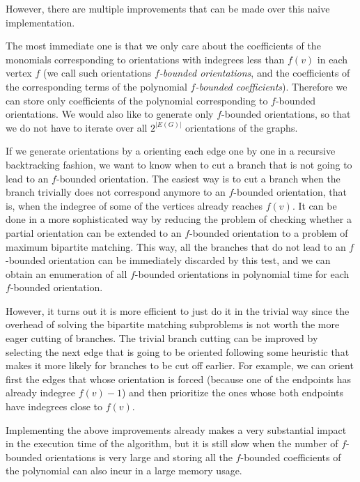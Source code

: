 However, there are multiple improvements that can be made over this naive implementation.

The most immediate one is that we only care about the coefficients of the monomials
corresponding to orientations with indegrees less than $f(v)$ in each vertex $f$ 
(we call such orientations \emph{$f$-bounded orientations}, and the coefficients of the 
corresponding terms of the polynomial
\emph{$f$-bounded coefficients}).
Therefore we can store only coefficients of the polynomial corresponding to $f$-bounded orientations.
We would also like to generate only $f$-bounded orientations, so that we do not have to iterate over all 
$2^{|E(G)|}$ orientations of the graphs. 

If we generate orientations by a orienting each edge one by
one in a recursive backtracking fashion, we want to know when to cut a branch that is not going to lead
to an $f$-bounded orientation. The easiest way is to cut a branch when the 
branch trivially does not correspond
anymore to an $f$-bounded orientation, that is, 
when the indegree of some of the vertices already reaches $f(v)$. 
It can be done in a more sophisticated way by reducing the problem of checking whether a partial 
orientation can be extended to an $f$-bounded 
orientation to a problem of maximum bipartite matching. This way,
all the branches that do not lead to an $f$-bounded 
orientation can be immediately discarded by this test, and 
we can obtain an enumeration of all $f$-bounded orientations in polynomial time for each 
$f$-bounded orientation.

However, it turns out it is more efficient to just do it in the trivial way since the overhead of solving
the bipartite matching subproblems is not worth the more eager cutting of branches. The trivial branch cutting
can be improved by selecting the next edge that is going to be oriented following some heuristic
that makes it more likely for branches to be cut off earlier. 
For example, we can orient first the edges that whose orientation is forced 
(because one of the endpoints has already indegree $f(v)-1$) 
and then prioritize the ones whose both endpoints have indegrees close to $f(v)$.

Implementing the above improvements already makes a very substantial impact in the execution time
of the algorithm, but it is still slow when the number of $f$-bounded orientations is very large
and storing all the $f$-bounded coefficients of the polynomial can also incur in a large memory usage.

